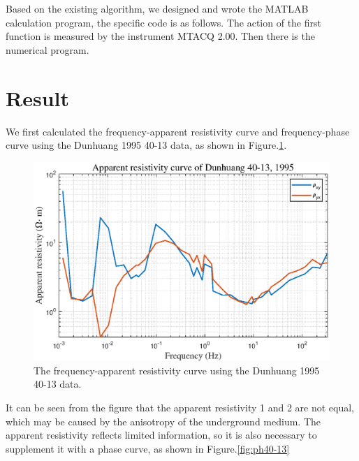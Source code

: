 \documentclass[9pt,a4paper,twoside]{rho-class/rho}
\begin{document}
Based on the existing algorithm, we designed and wrote the MATLAB calculation program, the specific code is as follows. The action of the first function is measured by the instrument MTACQ 2.00. Then there is the numerical program.

\nolinenumbers

\linenumbers

\section{Result}

We first calculated the frequency-apparent resistivity curve and frequency-phase curve using the Dunhuang 1995 40-13 data, as shown in Figure.\ref{fig:r40-13}.

\begin{figure}[H]
    \centering
    \includegraphics[width=0.95\columnwidth]{figures/r40-13.eps}
    \caption{The frequency-apparent resistivity curve  using the Dunhuang 1995 40-13 data.}
    \label{fig:r40-13}
\end{figure}

It can be seen from the figure that the apparent resistivity 1 and 2 are not equal, which may be caused by the anisotropy of the underground medium. The apparent resistivity reflects limited information, so it is also necessary to supplement it with a phase curve, as shown in Figure.\ref{fig:ph40-13}
\end{document}
